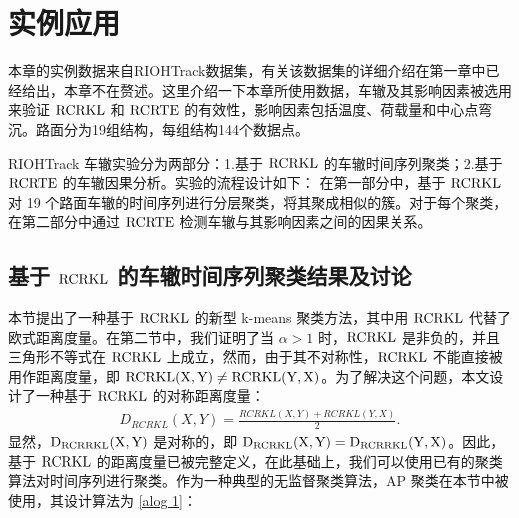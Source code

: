 \section{实例应用}
本章的实例数据来自RIOHTrack数据集，有关该数据集的详细介绍在第一章中已经给出，本章不在赘述。这里介绍一下本章所使用数据，车辙及其影响因素被选用来验证 $\rm{RCRKL}$ 和 $\rm{RCRTE}$ 的有效性，影响因素包括温度、荷载量和中心点弯沉。路面分为19组结构，每组结构144个数据点。

RIOHTrack 车辙实验分为两部分：1.基于 $\rm{RCRKL}$ 的车辙时间序列聚类；2.基于 $\rm{RCRTE}$ 的车辙因果分析。实验的流程设计如下： 在第一部分中，基于 $\rm{RCRKL}$ 对 19 个路面车辙的时间序列进行分层聚类，将其聚成相似的簇。对于每个聚类，在第二部分中通过 $\rm{RCRTE}$ 检测车辙与其影响因素之间的因果关系。

\subsection{基于 $\rm{RCRKL}$ 的车辙时间序列聚类结果及讨论}
本节提出了一种基于 $\rm{RCRKL}$ 的新型 k-means 聚类方法，其中用 $\rm{RCRKL}$ 代替了欧式距离度量。在第二节中，我们证明了当 $\alpha > 1$ 时，$\rm{RCRKL}$ 是非负的，并且三角形不等式在 $\rm{RCRKL}$ 上成立，然而，由于其不对称性，$\rm{RCRKL}$ 不能直接被用作距离度量，即 $\rm{RCRKL}(X,Y) \neq \rm{RCRKL}(Y,X)$。为了解决这个问题，本文设计了一种基于 $\rm{RCRKL}$ 的对称距离度量：
\begin{align*}
D_{RCRKL}(X,Y) = \frac{RCRKL(X,Y)+RCRKL(Y,X)}{2}.
\end{align*}
显然，$\rm{D_{RCRRKL}(X,Y)}$ 是对称的，即 $\rm{D_{RCRKL}(X,Y)} = \rm{D_{RCRRKL}(Y,X)}$。因此，基于 $\rm{RCRKL}$ 的距离度量已被完整定义，在此基础上，我们可以使用已有的聚类算法对时间序列进行聚类。作为一种典型的无监督聚类算法，AP 聚类在本节中被使用，其设计算法为 \ref{alog 1}：
